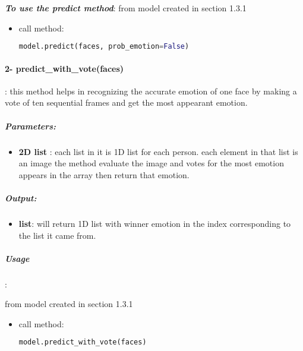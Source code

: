 \textbf{\textit{To use the predict method}}:
\bigbreak
from model created in section 1.3.1

\begin{itemize}
	\item call method:
	\begin{lstlisting}[language=Python]
	model.predict(faces, prob_emotion=False)\end{lstlisting}
\end{itemize}


\paragraph{2- predict\_with\_vote(faces)}:
this method helps in recognizing the accurate emotion of one face by making a vote of ten sequential frames and get the most appearant emotion. \newline

\subparagraph{Parameters:}
\begin{changemargin}{0.5cm}{0cm}
\begin{itemize}
	\item \textbf{2D list }:\newline
	each list in it is 1D list for each person. each element in that list is an image the method evaluate the image and votes for the most emotion appears in the array then return that emotion.
\end{itemize}
\end{changemargin}

\subparagraph{Output:}
\begin{changemargin}{0.5cm}{0cm}
\begin{itemize}
	\item \textbf{list}:\newline
	will return 1D list with winner emotion in the index corresponding to the list it came from.
\end{itemize}
\end{changemargin}

\subparagraph{Usage}:
\begin{changemargin}{0.5cm}{0cm}
from model created in section 1.3.1

\begin{itemize}
	\item call method:
	\begin{lstlisting}[language=Python]
	model.predict_with_vote(faces)\end{lstlisting}
\end{itemize}
\end{changemargin}

